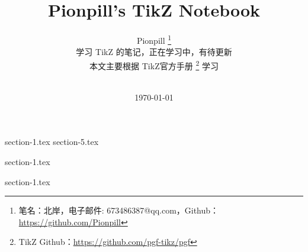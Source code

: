 \documentclass{PionpillNote-book}
\title{Pionpill's TikZ Notebook}
\author{
    Pionpill
    \footnote{笔名：北岸，电子邮件: 673486387@qq.com，Github：\url{https://github.com/Pionpill}}\\[2ex]
    学习 TikZ 的笔记，正在学习中，有待更新 \\
    本文主要根据 TikZ官方手册 \footnote{TikZ Github：\url{https://github.com/pgf-tikz/pgf}}  学习
    
    \\[2ex]
}
\date{\today}
\begin{document}
\maketitle                  %
\tableofcontents            %
\thispagestyle{empty}
\newpage
\setcounter{page}{1}


{section-1.tex}
{section-5.tex}

{section-1.tex}

{section-1.tex}

















\end{document}
